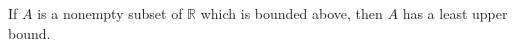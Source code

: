 If $A$ is a nonempty subset of $\mathbb{R}$ which is bounded above, then $A$ has a least upper bound.
